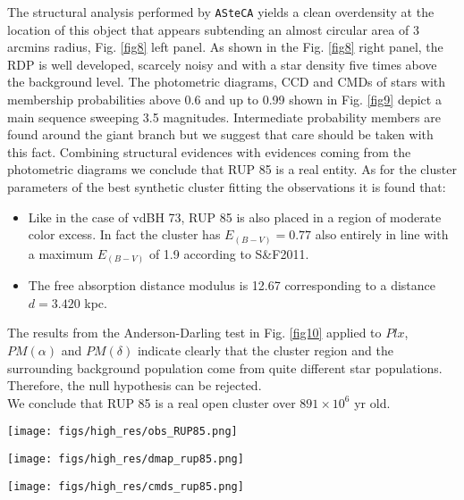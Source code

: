 \documentclass{aa}
\begin{document}
The structural analysis performed by \texttt{ASteCA} yields a clean overdensity
at the location of this object that appears subtending an almost circular area
of 3 arcmins radius, Fig. \ref{fig8} left panel. As shown in the Fig. \ref{fig8}
right panel, the RDP is well developed, scarcely noisy and with a star density
five times above the background level. The photometric diagrams, CCD and CMDs of
stars with membership probabilities above 0.6 and up to 0.99 shown in Fig.
\ref{fig9} depict a main sequence sweeping 3.5 magnitudes. Intermediate
probability members are found around the giant branch but we suggest that
care should be taken with this fact. Combining structural evidences with
evidences coming from the
photometric diagrams we conclude that RUP 85 is a real entity. As for the
cluster parameters of the best synthetic cluster fitting the observations it is
found that:

\begin{itemize}
\item [a)] Like in the case of vdBH 73, RUP 85 is also placed
    in a region of moderate color excess. In fact the cluster has $E_{(B-V)} =
    0.77$ also entirely in line with a maximum $E_{(B-V)}$ of 1.9 according to 
    S\&F2011.
\item [b)] The free absorption distance modulus is 12.67 corresponding to a
    distance $d = 3.420$ kpc.
\end{itemize}

The results from the Anderson-Darling test in Fig. \ref{fig10} applied to $Plx$,
$PM(\alpha)$ and $PM(\delta)$ indicate clearly that the cluster region and the
surrounding background population come from quite different star populations.
Therefore, the null hypothesis can be rejected.\\

We conclude that RUP 85 is a real open cluster over $891\times10^6$ yr old.

\begin{figure*}[ht]
    \centering
    \texttt{[image: figs/high\_res/obs\_RUP85.png]}
    \caption{Idem Fig. \ref{fig3} for RUP 85.}
    \label{fig7}
\end{figure*}

\begin{figure*}[ht]
    \centering
    \texttt{[image: figs/high\_res/dmap\_rup85.png]}
    \caption{Idem Fig. \ref{fig4} for RUP 85.}
    \label{fig8}
\end{figure*}

\begin{figure*}[ht]
    \centering
    \texttt{[image: figs/high\_res/cmds\_rup85.png]}
    \caption{Idem Fig. \ref{fig5} for RUP 85.}
    \label{fig9}
\end{figure*}
\end{document}
